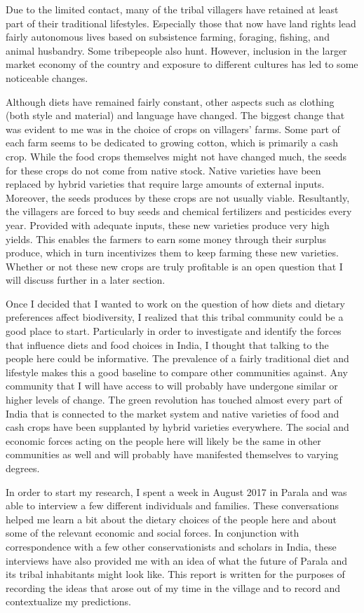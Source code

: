 \documentclass{report}
\begin{document}
Due to the limited contact, many of the tribal villagers have retained at least part of their traditional lifestyles. Especially those that now have land rights lead fairly autonomous lives based on subsistence farming, foraging, fishing, and animal husbandry. Some tribepeople also hunt. However, inclusion in the larger market economy of the country and exposure to different cultures has led to some noticeable changes.

Although diets have remained fairly constant, other aspects such as clothing (both style and material) and language have changed. The biggest change that was evident to me was in the choice of crops on villagers' farms. Some part of each farm seems to be dedicated to growing cotton, which is primarily a cash crop. While the food crops themselves might not have changed much, the seeds for these crops do not come from native stock. Native varieties have been replaced by hybrid varieties that require large amounts of external inputs. Moreover, the seeds produces by these crops are not usually viable. Resultantly, the villagers are forced to buy seeds and chemical fertilizers and pesticides every year. Provided with adequate inputs, these new varieties produce very high yields. This enables the farmers to earn some money through their surplus produce, which in turn incentivizes them to keep farming these new varieties. Whether or not these new crops are truly profitable is an open question that I will discuss further in a later section.

Once I decided that I wanted to work on the question of how diets and dietary preferences affect biodiversity, I realized that this tribal community could be a good place to start. Particularly in order to investigate and identify the forces that influence diets and food choices in India, I thought that talking to the people here could be informative. The prevalence of a fairly traditional diet and lifestyle makes this a good baseline to compare other communities against. Any community that I will have access to will probably have undergone similar or higher levels of change. The green revolution has touched almost every part of India that is connected to the market system and native varieties of food and cash crops have been supplanted by hybrid varieties everywhere. The social and economic forces acting on the people here will likely be the same in other communities as well and will probably have manifested themselves to varying degrees.

In order to start my research, I spent a week in August 2017 in Parala and was able to interview a few different individuals and families. These conversations helped me learn a bit about the dietary choices of the people here and about some of the relevant economic and social forces. In conjunction with correspondence with a few other conservationists and scholars in India, these interviews have also provided me with an idea of what the future of Parala and its tribal inhabitants might look like. This report is written for the purposes of recording the ideas that arose out of my time in the village and to record and contextualize my predictions.
\end{document}
